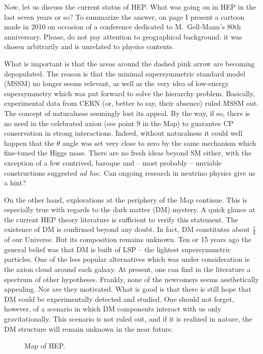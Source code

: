 \documentclass[epsfig,12pt]{article}
\begin{document}
Now, let us discuss the current status of HEP. What was going on in HEP in the last seven years or so? To summarize the answer, on page \pageref{figu2ok} I present a cartoon made in 2010 on occasion of 
a conference dedicated to M.~Gell-Mann's 80th anniversary. Please, do not pay attention to geographical background: it was chosen arbitrarily and is unrelated to physics contents. 

What is important is that the areas around the dashed pink arrow are becoming depopulated. The reason is that the minimal supersymmetric standard model (MSSM) no longer seems relevant, as well 
as the very idea of low-energy supersymmetry
which was put forward  to solve the hierarchy problem. Basically, experimental data from CERN (or, better to say, their absence) ruled MSSM out. The concept of naturalness seemingly lost its appeal. 
By the way, if so, there is no need in the celebrated axion (see point 9 in the Map) to guarantee CP conservation in strong interactions. Indeed, without naturalness it could well happen that the $\theta$ angle was set very  close to zero by the same mechanism which fine-tuned the Higgs mass. There are no fresh ideas beyond SM either, with the exception of a few contrived, baroque and -- most probably -- unviable constructions suggested {\em ad hoc}. 
Can ongoing research in neutrino physics give us a hint?

On the other hand, explorations at the periphery of the Map continue. This is especially true with regards to the dark matter  (DM) mystery. A quick
 glance at the current HEP theory literature  is sufficient to verify this statement. The existence of DM is confirmed beyond any doubt. In fact, DM constitutes about $\frac 14$ of our Universe.
 But its composition remains unknown. Ten or 15 years ago the general belief was that DM is built of LSP -- the lightest supersymmetric particles. One of  the less popular alternatives which was under consideration 
 is the axion cloud around each galaxy. At present, one can find in the literature a spectrum of other hypotheses. Frankly, none of the newcomers seems aesthetically appealing. Nor are they motivated.
 What is good is that there is still hope that DM could be experimentally detected and studied. One should not forget, however, of a  scenario in which DM components interact with us only gravitationally. This scenario is not ruled out, and if it is realized in nature,  the DM structure will remain unknown in the near future.
 
 \vspace{1mm}
 \begin{figure}[h]
\epsfxsize=12.5cm
\centerline{}
\caption{\small
 Map of HEP.}
\label{figu2ok}
\end{figure}
\end{document}
